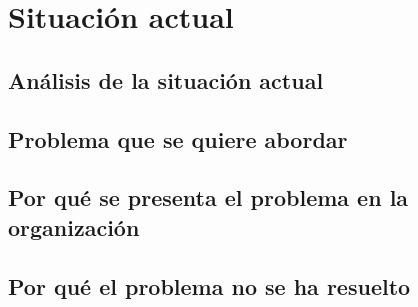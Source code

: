 \section{Situación actual}
\label{section:situacion}

\tinylipsum

\subsection{Análisis de la situación actual}
\label{subsection:analisis_situacion}

\tinylipsum

\subsection{Problema que se quiere abordar}
\label{subsection:problema_situacion}

\tinylipsum

\subsection{Por qué se presenta el problema en la organización}
\label{subsection:justificacion_situacion1}

\tinylipsum

\subsection{Por qué el problema no se ha resuelto}
\label{subsection:justificacion_situacion2}

\tinylipsum
